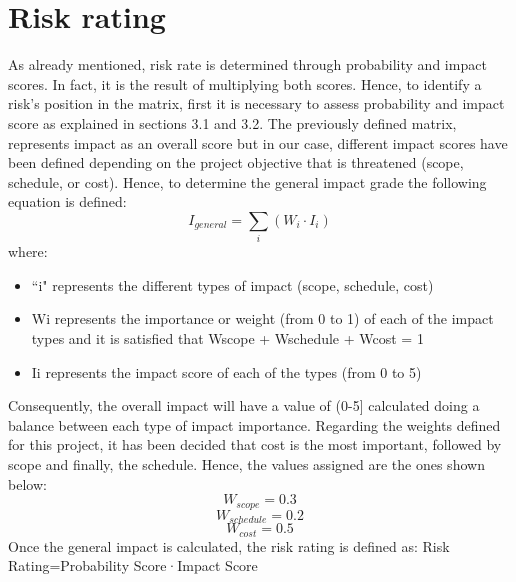 \section{Risk rating}
As already mentioned, risk rate is determined through probability and impact scores. In fact, it is the result of multiplying both scores. Hence, to identify a risk’s position in the matrix, first it is necessary to assess probability and impact score as explained in sections 3.1 and 3.2.
The previously defined matrix, represents impact as an overall score but in our case, different impact scores have been defined depending on the project objective that is threatened (scope, schedule, or cost). Hence, to determine the general impact grade the following equation is defined:
$$
I_{general}=\sum_{i}(W_i\cdot I_i)
$$
where:
\begin{itemize}
	\item “i" represents the different types of impact (scope, schedule, cost)
	\item Wi represents the importance or weight (from 0 to 1) of each of the impact types and it is satisfied that Wscope + Wschedule + Wcost = 1
	\item Ii represents the impact score of each of the types (from 0 to 5)
\end{itemize}


Consequently, the overall impact will have a value of (0-5] calculated doing a balance between each type of impact importance.
Regarding the weights defined for this project, it has been decided that cost is the most important, followed by scope and finally, the schedule. Hence, the values assigned are the ones shown  below:
	$$W_{scope}=0.3$$
	$$W_{schedule}=0.2$$
	$$W_{cost}=0.5$$
Once the general impact is calculated, the risk rating is defined as:
Risk Rating=Probability Score·Impact Score

